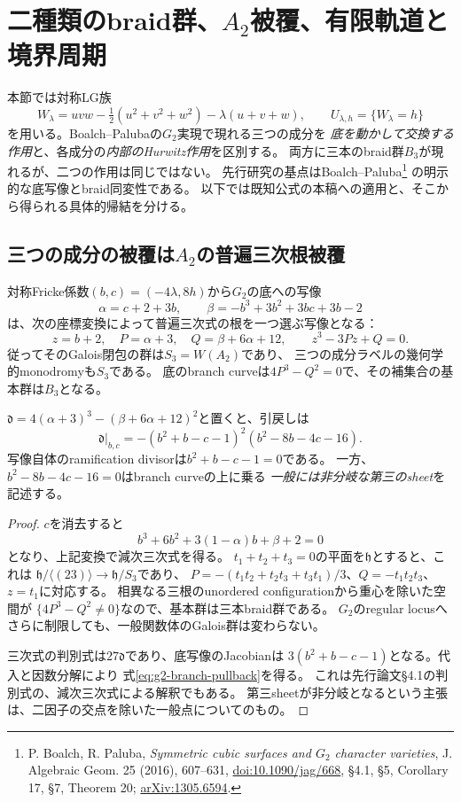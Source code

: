 \section{二種類のbraid群、\texorpdfstring{$A_2$}{A2}被覆、有限軌道と境界周期}
\label{sec:g2-braids-periods}
本節では対称LG族
\[
 W_\lambda=uvw-\tfrac12(u^2+v^2+w^2)-\lambda(u+v+w),
 \qquad U_{\lambda,h}=\{W_\lambda=h\}
\]
を用いる。Boalch--Palubaの$G_2$実現で現れる三つの成分を
\emph{底を動かして交換する作用}と、各成分の\emph{内部のHurwitz作用}を区別する。
両方に三本のbraid群$B_3$が現れるが、二つの作用は同じではない。
先行研究の基点はBoalch--Paluba\footnote{
P. Boalch, R. Paluba, \emph{Symmetric cubic surfaces and $G_2$ character varieties},
J. Algebraic Geom. 25 (2016), 607--631,
\href{https://doi.org/10.1090/jag/668}{doi:10.1090/jag/668},
\S4.1, \S5, Corollary 17, \S7, Theorem 20;
\href{https://arxiv.org/abs/1305.6594}{arXiv:1305.6594}.}
の明示的な底写像とbraid同変性である。
以下では既知公式の本稿への適用と、そこから得られる具体的帰結を分ける。

\subsection{三つの成分の被覆は\texorpdfstring{$A_2$}{A2}の普遍三次根被覆}
\begin{theorem}
\label{thm:g2-component-A2}
対称Fricke係数$(b,c)=(-4\lambda,8h)$から$G_2$の底への写像
\[
 \alpha=c+2+3b,\qquad
 \beta=-b^3+3b^2+3bc+3b-2
\]
は、次の座標変換によって普遍三次式の根を一つ選ぶ写像となる：
\[
 z=b+2,\quad P=\alpha+3,\quad Q=\beta+6\alpha+12,
 \qquad z^3-3Pz+Q=0.
\]
従ってそのGalois閉包の群は$S_3=W(A_2)$であり、
三つの成分ラベルの幾何学的monodromyも$S_3$である。
底のbranch curveは$4P^3-Q^2=0$で、その補集合の基本群は$B_3$となる。

$\mathfrak d=4(\alpha+3)^3-(\beta+6\alpha+12)^2$と置くと、引戻しは
\begin{equation}\label{eq:g2-branch-pullback}
 \mathfrak d|_{b,c}
 =-(b^2+b-c-1)^2(b^2-8b-4c-16).
\end{equation}
写像自体のramification divisorは$b^2+b-c-1=0$である。
一方、$b^2-8b-4c-16=0$はbranch curveの上に乗る
\emph{一般には非分岐な第三のsheet}を記述する。
\end{theorem}
\begin{proof}
$c$を消去すると
\[
 b^3+6b^2+3(1-\alpha)b+\beta+2=0
\]
となり、上記変換で減次三次式を得る。
$t_1+t_2+t_3=0$の平面を$\mathfrak h$とすると、これは
$\mathfrak h/\langle(23)\rangle\to\mathfrak h/S_3$であり、
$P=-(t_1t_2+t_2t_3+t_3t_1)/3$、$Q=-t_1t_2t_3$、$z=t_1$に対応する。
相異なる三根のunordered configurationから重心を除いた空間が
$\{4P^3-Q^2\ne0\}$なので、基本群は三本braid群である。
$G_2$のregular locusへさらに制限しても、一般関数体のGalois群は変わらない。

三次式の判別式は$27\mathfrak d$であり、底写像のJacobianは
$3(b^2+b-c-1)$となる。代入と因数分解により
式\eqref{eq:g2-branch-pullback}を得る。
これは先行論文\S4.1の判別式の、減次三次式による解釈でもある。
第三sheetが非分岐となるという主張は、二因子の交点を除いた一般点についてのもの。
\end{proof}


